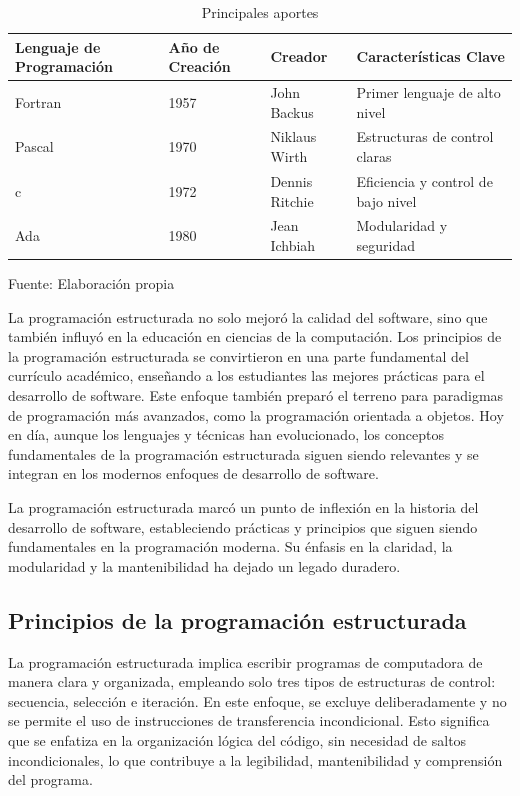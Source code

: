 \begin{table}[!h]
  \begin{center}
    \begin{tabularx}{0.9\textwidth}{|X|X|X|X|}
      \hline
      \textbf{Lenguaje de Programación} & \textbf{Año de Creación} & \textbf{Creador} & \textbf{Características Clave} \\
      \hline
      Fortran & 1957 & John Backus & Primer lenguaje de alto nivel \\
      \hline
      Pascal & 1970 & Niklaus Wirth & Estructuras de control claras \\
      \hline
      c & 1972 & Dennis Ritchie & Eficiencia y control de bajo nivel \\
      \hline
      Ada & 1980 & Jean Ichbiah & Modularidad y seguridad \\
      \hline
    \end{tabularx}
  \end{center}
  \caption{Principales aportes}
  \centering Fuente: Elaboración propia
  \label{tab:aportes}
\end{table}

La programación estructurada no solo mejoró la calidad del software, sino que también influyó en la educación en ciencias de la computación. Los principios de la programación estructurada se convirtieron en una parte fundamental del currículo académico, enseñando a los estudiantes las mejores prácticas para el desarrollo de software. Este enfoque también preparó el terreno para paradigmas de programación más avanzados, como la programación orientada a objetos. Hoy en día, aunque los lenguajes y técnicas han evolucionado, los conceptos fundamentales de la programación estructurada siguen siendo relevantes y se integran en los modernos enfoques de desarrollo de software.

La programación estructurada marcó un punto de inflexión en la historia del desarrollo de software, estableciendo prácticas y principios que siguen siendo fundamentales en la programación moderna. Su énfasis en la claridad, la modularidad y la mantenibilidad ha dejado un legado duradero.

\subsection{Principios de la programación estructurada}
La programación estructurada implica escribir programas de computadora de manera clara y organizada, empleando solo tres tipos de estructuras de control: secuencia, selección e iteración. En este enfoque, se excluye deliberadamente y no se permite el uso de instrucciones de transferencia incondicional. Esto significa que se enfatiza en la organización lógica del código, sin necesidad de saltos incondicionales, lo que contribuye a la legibilidad, mantenibilidad y comprensión del programa. \parencite{Alvarez2022}

